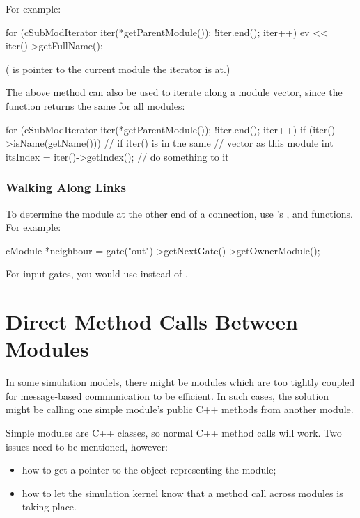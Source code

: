For example:

\begin{cpp}
for (cSubModIterator iter(*getParentModule()); !iter.end(); iter++)
{
  ev << iter()->getFullName();
}
\end{cpp}

( is pointer to the current module the iterator is at.)


The above method can also be used to iterate along a module
vector, since the 
function returns the same for all modules:

\begin{cpp}
for (cSubModIterator iter(*getParentModule()); !iter.end(); iter++)
{
  if (iter()->isName(getName())) // if iter() is in the same
                              // vector as this module
  {
    int itsIndex = iter()->getIndex();
    // do something to it
  }
}
\end{cpp}


\subsubsection{Walking Along Links}

To determine the module at the other end of a connection, use
's ,  and
 functions. For example:

\begin{cpp}
cModule *neighbour = gate("out")->getNextGate()->getOwnerModule();
\end{cpp}

For input gates, you would use  instead of
.


\section{Direct Method Calls Between Modules}
\label{sec:simple-modules:direct-method-calls}

In some simulation models, there might be modules which are too
tightly coupled for message-based communication to be efficient.
In such cases, the solution might be calling one simple module's public
C++ methods from another module.

Simple modules are C++ classes, so normal C++ method calls will
work. Two issues need to be mentioned, however:

\begin{itemize}
  \item how to get a pointer to the object representing the module;
  \item how to let the simulation kernel know that a method call across modules
     is taking place.
\end{itemize}

